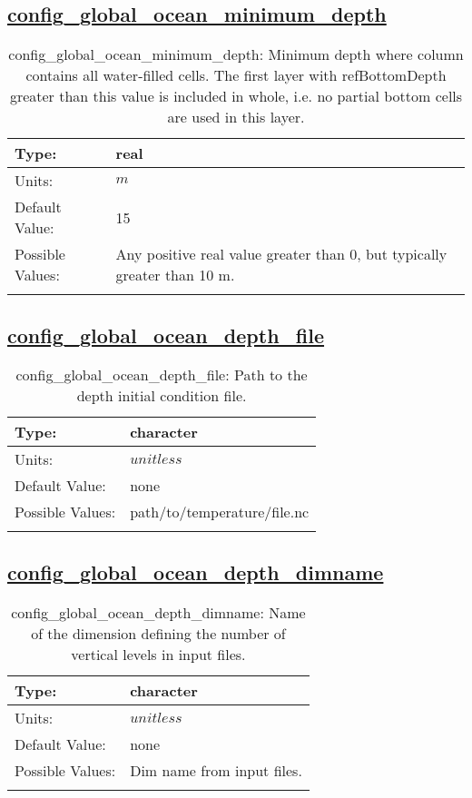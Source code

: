 \subsection[config\_global\_ocean\_minimum\_depth]{\hyperref[sec:nm_tab_global_ocean]{config\_global\_ocean\_minimum\_depth}}
\label{subsec:nm_sec_config_global_ocean_minimum_depth}
\begin{center}
\begin{longtable}{| p{2.0in} || p{4.0in} |}
    \hline
    Type: & real \\
    \hline
    Units: & $m$ \\
    \hline
    Default Value: & 15 \\
    \hline
    Possible Values: & Any positive real value greater than 0, but typically greater than 10 m. \\
    \hline
    \caption{config\_global\_ocean\_minimum\_depth: Minimum depth where column contains all water-filled cells.  The first layer with refBottomDepth greater than this value is included in whole, i.e. no partial bottom cells are used in this layer.}
\end{longtable}
\end{center}
\subsection[config\_global\_ocean\_depth\_file]{\hyperref[sec:nm_tab_global_ocean]{config\_global\_ocean\_depth\_file}}
\label{subsec:nm_sec_config_global_ocean_depth_file}
\begin{center}
\begin{longtable}{| p{2.0in} || p{4.0in} |}
    \hline
    Type: & character \\
    \hline
    Units: & $unitless$ \\
    \hline
    Default Value: & none \\
    \hline
    Possible Values: & path/to/temperature/file.nc \\
    \hline
    \caption{config\_global\_ocean\_depth\_file: Path to the depth initial condition file.}
\end{longtable}
\end{center}
\subsection[config\_global\_ocean\_depth\_dimname]{\hyperref[sec:nm_tab_global_ocean]{config\_global\_ocean\_depth\_dimname}}
\label{subsec:nm_sec_config_global_ocean_depth_dimname}
\begin{center}
\begin{longtable}{| p{2.0in} || p{4.0in} |}
    \hline
    Type: & character \\
    \hline
    Units: & $unitless$ \\
    \hline
    Default Value: & none \\
    \hline
    Possible Values: & Dim name from input files. \\
    \hline
    \caption{config\_global\_ocean\_depth\_dimname: Name of the dimension defining the number of vertical levels in input files.}
\end{longtable}
\end{center}
